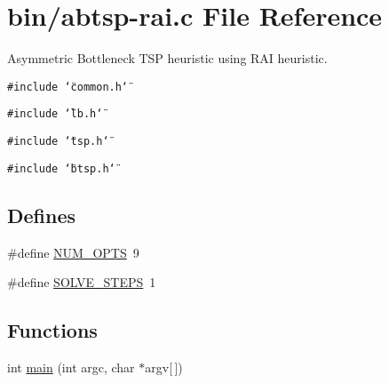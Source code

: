 \hypertarget{abtsp-rai_8c}{
\section{bin/abtsp-rai.c File Reference}
\label{abtsp-rai_8c}
}
Asymmetric Bottleneck TSP heuristic using RAI heuristic.  


{\tt \#include \char`\"{}common.h\char`\"{}}\par
{\tt \#include \char`\"{}lb.h\char`\"{}}\par
{\tt \#include \char`\"{}tsp.h\char`\"{}}\par
{\tt \#include \char`\"{}btsp.h\char`\"{}}\par
\subsection*{Defines}
\begin{CompactItemize}
\item 
\#define \hyperlink{abtsp-rai_8c_9b58b2c4af931c8486a986c9deca40f5}{NUM\_\-OPTS}~9
\item 
\#define \hyperlink{abtsp-rai_8c_ceebcce8f411269df7b99e78247d7497}{SOLVE\_\-STEPS}~1
\end{CompactItemize}
\subsection*{Functions}
\begin{CompactItemize}
\item 
int \hyperlink{abtsp-rai_8c_0ddf1224851353fc92bfbff6f499fa97}{main} (int argc, char $\ast$argv\mbox{[}$\,$\mbox{]})
\end{CompactItemize}
